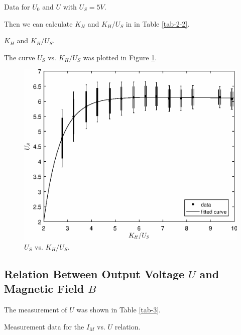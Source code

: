 \documentclass{article}
\begin{document}
\begin{table}[!h]
\begin{center}

\caption{Data for $U_0$ and $U$ with $U_S=5V$.}
\label{tab-2}
\end{center}
\end{table}

Then we can calculate $K_H$ and $K_H/U_S$ in in Table \ref{tab-2-2}.

\begin{table}[!h]
\begin{center}

\caption{$K_H$ and $K_H/U_S$.}
\label{tab-2-2}
\end{center}
\end{table}

The curve $U_S$ vs. $K_H/U_S$ was plotted in Figure \ref{fig-1}.

\begin{figure}[H]
	\centering
	\includegraphics[scale=0.6]{fig1.eps}
	\caption{$U_S$ vs. $K_H/U_S$.}
	\label{fig-1}
\end{figure}

\newpage


\subsection{Relation Between Output Voltage $ U $ and Magnetic Field $ B $}

The measurement of $U$ was shown in Table \ref{tab-3}.

\begin{table}[!h]
\begin{center}

\caption{Measurement data for the $I_M$ vs. $U$ relation.}
\label{tab-3}
\end{center}
\end{table}
\end{document}
